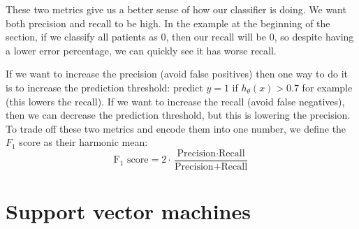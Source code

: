 \documentclass[a4paper,11pt]{report}
\begin{document}
These two metrics give us a better sense of how our classifier is doing. We want both precision and recall to be high. In the example at the beginning of the section, if we classify all patients as 0, then our recall will be $0$, so despite having a lower error percentage, we can quickly see it has worse recall.

If we want to increase the precision (avoid false positives) then one way to do it is to increase the prediction threshold: predict $y=1$ if $h_\theta(x) > 0.7$ for example (this lowers the recall). If we want to increase the recall (avoid false negatives), then we can decrease the prediction threshold, but this is lowering the precision. To trade off these two metrics and encode them into one number, we define the $F_1$ score as their harmonic mean:
\begin{equation}\label{df:F1score}
\textrm{F}_1 \textrm{ score} = 2\cdot \dfrac{\textrm{Precision}\cdot \textrm{Recall}}{\textrm{Precision}+ \textrm{Recall}} 
\end{equation}


\chapter{Support vector machines}
\end{document}
